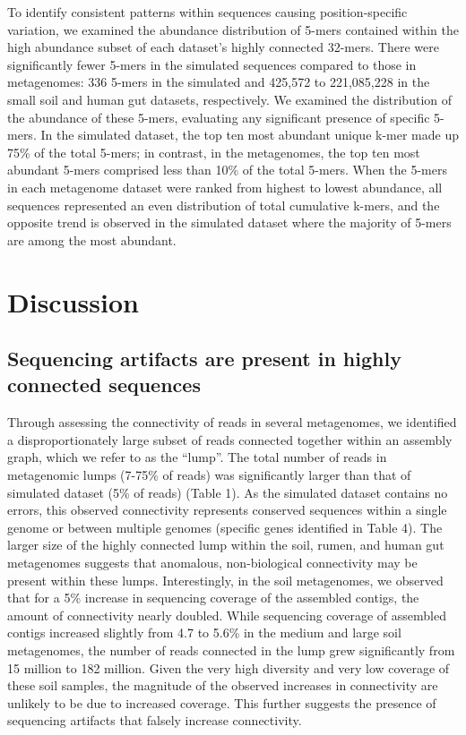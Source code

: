 \documentclass[10pt]{article}
\begin{document}
To identify consistent patterns within sequences causing
position-specific variation, we examined the abundance distribution of
5-mers contained within the high abundance subset of each dataset's
highly connected 32-mers.  There were significantly fewer 5-mers in
the simulated sequences compared to those in metagenomes: 336 5-mers
in the simulated and 425,572 to 221,085,228 in the small soil and
human gut datasets, respectively.  We examined the distribution of the
abundance of these 5-mers, evaluating any significant presence of
specific 5-mers.  In the simulated dataset, the top ten most abundant
unique k-mer made up 75\% of the total 5-mers; in contrast, in the
metagenomes, the top ten most abundant 5-mers comprised less than 10\%
of the total 5-mers.  When the 5-mers in each metagenome dataset were
ranked from highest to lowest abundance, all sequences represented an
even distribution of total cumulative k-mers, and the opposite trend
is observed in the simulated dataset where the majority of 5-mers are
among the most abundant.

\section*{Discussion}

\subsection*{Sequencing artifacts are present in highly connected sequences}

Through assessing the connectivity of reads in several metagenomes, we
identified a disproportionately large subset of reads
connected together within an assembly graph, which we refer to as
the ``lump''.
The total number of reads in
metagenomic lumps (7-75\% of reads) was significantly larger than that
of simulated dataset (5\% of reads) (Table 1).  As the simulated
dataset contains no errors, this observed connectivity represents
conserved sequences within a single genome or between multiple genomes
(specific genes identified in Table 4).  The larger size of the highly
connected lump within the soil, rumen, and human gut metagenomes
suggests that anomalous, non-biological connectivity may be present
within these lumps.  Interestingly, in the soil metagenomes, we
observed that for a 5\% increase in sequencing coverage of the assembled
contigs, the amount of connectivity nearly doubled.
While sequencing coverage of assembled contigs
increased slightly from 4.7 to 5.6\% in the medium and large soil
metagenomes, the number of reads connected in the lump grew
significantly from 15 million to 182 million.  Given the very high
diversity and very low coverage of these soil samples, the magnitude of the
observed increases in connectivity are unlikely to be due to increased
coverage.  This further suggests the presence of sequencing artifacts
that falsely increase connectivity.
\end{document}
